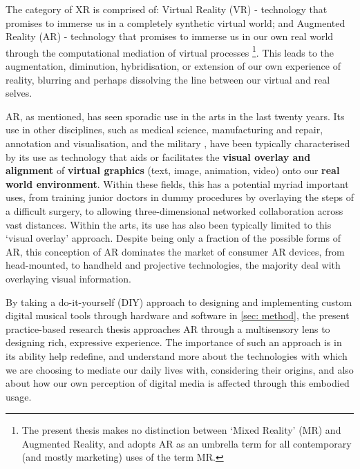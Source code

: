 The category of XR is comprised of: Virtual Reality (VR) - technology that promises to immerse us in a completely synthetic virtual world; and Augmented Reality (AR) - technology that promises to immerse us in our own real world through the computational mediation of virtual processes \footnote{The present thesis makes no distinction between `Mixed Reality' (MR) and Augmented Reality, and adopts AR as an umbrella term for all contemporary (and mostly marketing) uses of the term MR.}. This leads to the augmentation, diminution, hybridisation, or extension of our own experience of reality, blurring and perhaps dissolving the line between our virtual and real selves.

AR, as mentioned, has seen sporadic use in the arts in the last twenty years. Its use in other disciplines, such as medical science, manufacturing and repair, annotation and visualisation, and the military \citep{azuma1997}, have been typically characterised by its use as technology that aids or facilitates the \textbf{visual overlay and alignment} of \textbf{virtual graphics} (text, image, animation, video) onto our \textbf{real world environment}. Within these fields, this has a potential myriad important uses, from training junior doctors in dummy procedures by overlaying the steps of a difficult surgery, to allowing three-dimensional networked collaboration across vast distances. Within the arts, its use has also been typically limited to this `visual overlay' approach. Despite being only a fraction of the possible forms of AR, this conception of AR dominates the market of consumer AR devices, from head-mounted, to handheld and projective technologies, the majority deal with overlaying visual information. 

By taking a do-it-yourself (DIY) approach to designing and implementing custom digital musical tools through hardware and software in \autoref{sec: method}, the present practice-based research thesis approaches AR through a multisensory lens to designing rich, expressive experience. The importance of such an approach is in its ability help redefine, and understand more about the technologies with which we are choosing to mediate our daily lives with, considering their origins, and also about how our own perception of digital media is affected through this embodied usage. 



